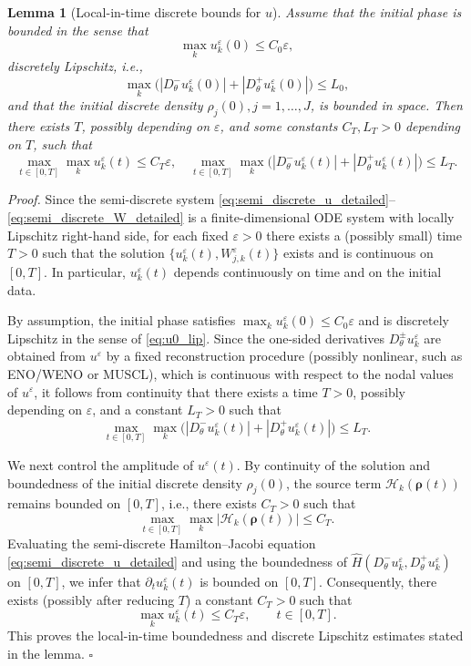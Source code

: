 \documentclass[11pt, dina4, amsfont12]{article}
\newtheorem{lemma}{Lemma}[section]
\begin{document}
\begin{lemma}[Local-in-time discrete bounds for $u$]\label{lem:slope_u}
Assume that the initial phase is bounded in the sense that
\[
    \max_k u_k^\varepsilon(0) \le C_0 \varepsilon, 
\]
discretely Lipschitz, i.e.,
\begin{equation}\label{eq:u0_lip}
\max_{k}\Big(|D_\theta^-u_k^\varepsilon(0)|+|D_\theta^+u_k^\varepsilon(0)|\Big)
\le L_0,
\end{equation}
and that the initial discrete density $\rho_j(0), j=1,\dots,J$, is bounded in space. 
Then there exists $T$, possibly depending on $\varepsilon$, and some constants $C_T, L_T>0$ depending on $T$, such that
\[
\max_{t\in[0,T]}\max_k u_k^\varepsilon(t) \le C_T \varepsilon, 
\quad
\max_{t\in[0,T]}\max_{k}
\Big(|D_\theta^-u_k^\varepsilon(t)|
    +|D_\theta^+u_k^\varepsilon(t)|\Big)
\le L_T .
\]
\end{lemma}

\textit{Proof.}
Since the semi-discrete system
\eqref{eq:semi_discrete_u_detailed}--\eqref{eq:semi_discrete_W_detailed}
is a finite-dimensional ODE system with locally Lipschitz right-hand side,
for each fixed $\varepsilon>0$ there exists a (possibly small) time
$T>0$ such that the solution
$\{u_k^\varepsilon(t),W_{j,k}^\varepsilon(t)\}$ exists and is continuous on $[0,T]$.
In particular, $u_k^\varepsilon(t)$ depends continuously on time and on the
initial data.

By assumption, the initial phase satisfies
$\max_k u_k^\varepsilon(0)\le C_0\varepsilon$ and is discretely Lipschitz in the
sense of \eqref{eq:u0_lip}.  
Since the one-sided derivatives $D_\theta^\pm u_k^\varepsilon$ are obtained from
$u^\varepsilon$ by a fixed reconstruction procedure (possibly nonlinear, such as
ENO/WENO or MUSCL), which is continuous with respect to the nodal values of
$u^\varepsilon$, it follows from continuity that there exists a time
$T>0$, possibly depending on $\varepsilon$, and a constant $L_T>0$ such that
\[
\max_{t\in[0,T]}\max_k
\big(|D_\theta^-u_k^\varepsilon(t)|
    +|D_\theta^+u_k^\varepsilon(t)|\big)
\le L_T .
\]

We next control the amplitude of $u^\varepsilon(t)$.
By continuity of the solution and boundedness of the initial discrete density
$\rho_j(0)$, the source term $\mathcal H_k(\boldsymbol\rho(t))$ remains bounded on
$[0,T]$, i.e., there exists $C_T>0$ such that
\[
\max_{t\in[0,T]}\max_k |\mathcal H_k(\boldsymbol\rho(t))|\le C_T .
\]
Evaluating the semi-discrete Hamilton--Jacobi equation
\eqref{eq:semi_discrete_u_detailed} and using the boundedness of
$\widehat{H}(D_\theta^-u_k^\varepsilon,D_\theta^+u_k^\varepsilon)$ on
$[0,T]$, we infer that $\partial_t u_k^\varepsilon(t)$ is bounded on $[0,T]$.
Consequently, there exists (possibly after reducing $T$) a constant $C_T>0$ such
that
\[
\max_k u_k^\varepsilon(t)\le C_T\varepsilon,
\qquad t\in[0,T].
\]
This proves the local-in-time boundedness and discrete Lipschitz estimates stated in the lemma.
\hfill$\square$
\end{document}
